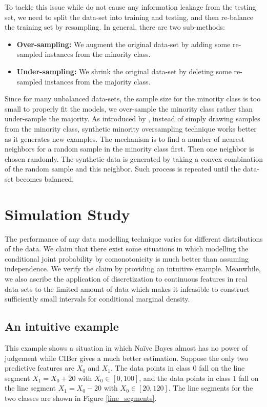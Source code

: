 \documentclass[twoside,11pt]{article}
\begin{document}
To tackle this issue while do not cause any information leakage from the testing set, we need to split the data-set into training and testing, and then re-balance the training set by resampling. In general, there are two sub-methods:
\begin{itemize}
    \item \textbf{Over-sampling: } We augment the original data-set by adding some re-sampled instances from the minority class.
    \item \textbf{Under-sampling: } We shrink the original data-set by deleting some re-sampled instances from the majority class.
\end{itemize}
Since for many unbalanced data-sets, the sample size for the minority class is too small to properly fit the models, we over-sample the minority class rather than under-sample the majority. As introduced by \citet{fernandez2018smote}, instead of simply drawing samples from the minority class, synthetic minority oversampling technique works better as it generates new examples. The mechanism is to find a number of nearest neighbors for a random sample in the minority class first. Then one neighbor is chosen randomly. The synthetic data is generated by taking a convex combination of the random sample and this neighbor. Such process is repeated until the data-set becomes balanced.

\section{Simulation Study}\label{simulation}
The performance of any data modelling technique varies for different distributions of the data. We claim that there exist some situations in which modelling the conditional joint probability by comonotonicity is much better than assuming independence. We verify the claim by providing an intuitive example. Meanwhile, we also ascribe the application of discretization to continuous features in real data-sets to the limited amount of data which makes it infeasible to construct sufficiently small intervals for conditional marginal density.

\subsection{An intuitive example}\label{intuitive_example}
This example shows a situation in which Na\"ive Bayes almost has no power of judgement while CIBer gives a much better estimation. Suppose the only two predictive features are $X_0$ and $X_1$. The data points in class $0$ fall on the line segment $X_1 = X_0 + 20$ with $X_0\in[0,100]$, and the data points in class $1$ fall on the line segment $X_1 = X_0 - 20$ with $X_0\in[20,120]$. The line segments for the two classes are shown in Figure \ref{line_segments}.
\end{document}
